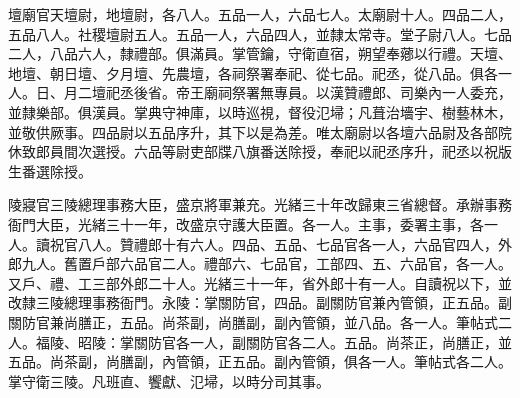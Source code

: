 \begin{pinyinscope}
壇廟官天壇尉，地壇尉，各八人。五品一人，六品七人。太廟尉十人。四品二人，五品八人。社稷壇尉五人。五品一人，六品四人，並隸太常寺。堂子尉八人。七品二人，八品六人，隸禮部。俱滿員。掌管鑰，守衛直宿，朔望奉薌以行禮。天壇、地壇、朝日壇、夕月壇、先農壇，各祠祭署奉祀、從七品。祀丞，從八品。俱各一人。日、月二壇祀丞後省。帝王廟祠祭署無專員。以漢贊禮郎、司樂內一人委充，並隸樂部。俱漢員。掌典守神庫，以時巡視，督役氾埽；凡葺治墻宇、樹藝林木，並敬供厥事。四品尉以五品序升，其下以是為差。唯太廟尉以各壇六品尉及各部院休致郎員間次選授。六品等尉吏部牒八旗番送除授，奉祀以祀丞序升，祀丞以祝版生番選除授。

陵寢官三陵總理事務大臣，盛京將軍兼充。光緒三十年改歸東三省總督。承辦事務衙門大臣，光緒三十一年，改盛京守護大臣置。各一人。主事，委署主事，各一人。讀祝官八人。贊禮郎十有六人。四品、五品、七品官各一人，六品官四人，外郎九人。舊置戶部六品官二人。禮部六、七品官，工部四、五、六品官，各一人。又戶、禮、工三部外郎二十人。光緒三十一年，省外郎十有一人。自讀祝以下，並改隸三陵總理事務衙門。永陵：掌關防官，四品。副關防官兼內管領，正五品。副關防官兼尚膳正，五品。尚茶副，尚膳副，副內管領，並八品。各一人。筆帖式二人。福陵、昭陵：掌關防官各一人，副關防官各二人。五品。尚茶正，尚膳正，並五品。尚茶副，尚膳副，內管領，正五品。副內管領，俱各一人。筆帖式各二人。掌守衛三陵。凡班直、饗獻、氾埽，以時分司其事。


\end{pinyinscope}
